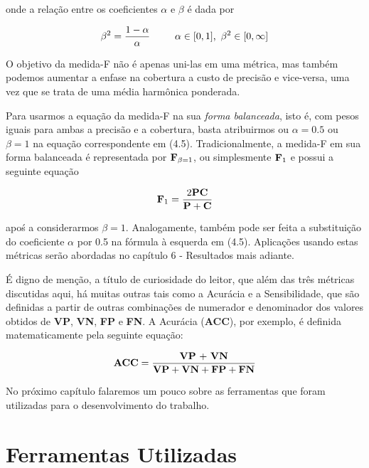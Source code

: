 \documentclass[11pt]{report}
\begin{document}
onde a relação entre os coeficientes $\alpha$ e $\beta$ é dada por

\begin{equation}
 \beta^2 = \dfrac{1 - \alpha}{\alpha} \enspace\enspace\enspace\enspace\enspace \alpha \in [0, 1]\text{,\enspace}\beta^2 \in [0, \infty]
\end{equation}

O objetivo da medida-F não é apenas uni-las em uma métrica, mas também podemos aumentar a enfase na cobertura a custo de precisão e vice-versa, uma vez que se trata de uma média harmônica ponderada.

Para usarmos a equação da medida-F na sua \textit{forma balanceada}, isto é, com pesos iguais para ambas a precisão e a cobertura, basta atribuirmos ou $\alpha = 0.5$ ou  $\beta = 1$ na equação correspondente em (4.5). Tradicionalmente, a medida-F em sua forma balanceada é representada por $\text{\textbf{F}}_{\beta = 1}$, ou simplesmente $\text{\textbf{F}}_{1}$ e possui
a seguinte equação

\begin{equation}
 \text{\textbf{F}}_1 = \dfrac{2\text{\textbf{PC}}}{\text{\textbf{P}} + \text{\textbf{C}}}
\end{equation}

apoś a considerarmos $\beta = 1$. Analogamente, também pode ser feita a substituição do coeficiente $\alpha$ por 0.5 na fórmula à esquerda em (4.5).
Aplicações usando estas métricas serão abordadas no capítulo 6 - Resultados mais adiante.

É digno de menção, a título de curiosidade do leitor, que além das três métricas discutidas aqui, há muitas outras tais como a Acurácia e a Sensibilidade, que são definidas
a partir de outras combinações de numerador e denominador dos valores obtidos de \textbf{VP}, \textbf{VN}, \textbf{FP} e \textbf{FN}. A Acurácia (\textbf{ACC}), por exemplo, é
definida matematicamente pela seguinte equação:

\begin{equation}
 \text{\textbf{ACC}} = \dfrac{\text{\textbf{VP} + \textbf{VN}}}{\text{\textbf{VP}} + \text{\textbf{VN}} + \text{\textbf{FP}} + \text{\textbf{FN}}}
\end{equation}

No próximo capítulo falaremos um pouco sobre as ferramentas que foram utilizadas para o desenvolvimento do trabalho.

\pagebreak
\chapter{Ferramentas Utilizadas}
\end{document}
